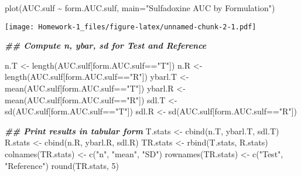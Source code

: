 \documentclass[
]{article}
\newenvironment{Shaded}{\begin{snugshade}}{\end{snugshade}}
\newcommand{\AttributeTok}[1]{\textcolor[rgb]{0.77,0.63,0.00}{#1}}
\newcommand{\DecValTok}[1]{\textcolor[rgb]{0.00,0.00,0.81}{#1}}
\newcommand{\DocumentationTok}[1]{\textcolor[rgb]{0.56,0.35,0.01}{\textbf{\textit{#1}}}}
\newcommand{\FunctionTok}[1]{\textcolor[rgb]{0.00,0.00,0.00}{#1}}
\newcommand{\NormalTok}[1]{#1}
\newcommand{\OtherTok}[1]{\textcolor[rgb]{0.56,0.35,0.01}{#1}}
\newcommand{\SpecialCharTok}[1]{\textcolor[rgb]{0.00,0.00,0.00}{#1}}
\newcommand{\StringTok}[1]{\textcolor[rgb]{0.31,0.60,0.02}{#1}}
\begin{document}
\begin{Shaded}
\begin{Highlighting}[]
\FunctionTok{plot}\NormalTok{(AUC.sulf }\SpecialCharTok{\textasciitilde{}}\NormalTok{ form.AUC.sulf, }\AttributeTok{main=}\StringTok{"Sulfadoxine AUC by Formulation"}\NormalTok{)}
\end{Highlighting}
\end{Shaded}

\texttt{[image: Homework-1\_files/figure-latex/unnamed-chunk-2-1.pdf]}

\begin{Shaded}
\begin{Highlighting}[]
\DocumentationTok{\#\# Compute n, ybar, sd for Test and Reference}

\NormalTok{n.T }\OtherTok{\textless{}{-}} \FunctionTok{length}\NormalTok{(AUC.sulf[form.AUC.sulf}\SpecialCharTok{==}\StringTok{"T"}\NormalTok{])}
\NormalTok{n.R }\OtherTok{\textless{}{-}} \FunctionTok{length}\NormalTok{(AUC.sulf[form.AUC.sulf}\SpecialCharTok{==}\StringTok{"R"}\NormalTok{])}
\NormalTok{ybarl.T }\OtherTok{\textless{}{-}} \FunctionTok{mean}\NormalTok{(AUC.sulf[form.AUC.sulf}\SpecialCharTok{==}\StringTok{"T"}\NormalTok{])}
\NormalTok{ybarl.R }\OtherTok{\textless{}{-}} \FunctionTok{mean}\NormalTok{(AUC.sulf[form.AUC.sulf}\SpecialCharTok{==}\StringTok{"R"}\NormalTok{])}
\NormalTok{sdl.T }\OtherTok{\textless{}{-}} \FunctionTok{sd}\NormalTok{(AUC.sulf[form.AUC.sulf}\SpecialCharTok{==}\StringTok{"T"}\NormalTok{])}
\NormalTok{sdl.R }\OtherTok{\textless{}{-}} \FunctionTok{sd}\NormalTok{(AUC.sulf[form.AUC.sulf}\SpecialCharTok{==}\StringTok{"R"}\NormalTok{])}

\DocumentationTok{\#\# Print results in tabular form}
\NormalTok{T.stats }\OtherTok{\textless{}{-}} \FunctionTok{cbind}\NormalTok{(n.T, ybarl.T, sdl.T)}
\NormalTok{R.stats }\OtherTok{\textless{}{-}} \FunctionTok{cbind}\NormalTok{(n.R, ybarl.R, sdl.R)}
\NormalTok{TR.stats }\OtherTok{\textless{}{-}} \FunctionTok{rbind}\NormalTok{(T.stats, R.stats)}
\FunctionTok{colnames}\NormalTok{(TR.stats) }\OtherTok{\textless{}{-}} \FunctionTok{c}\NormalTok{(}\StringTok{"n"}\NormalTok{, }\StringTok{"mean"}\NormalTok{, }\StringTok{"SD"}\NormalTok{)}
\FunctionTok{rownames}\NormalTok{(TR.stats) }\OtherTok{\textless{}{-}} \FunctionTok{c}\NormalTok{(}\StringTok{"Test"}\NormalTok{, }\StringTok{"Reference"}\NormalTok{)}
\FunctionTok{round}\NormalTok{(TR.stats, }\DecValTok{5}\NormalTok{)}
\end{Highlighting}
\end{Shaded}
\end{document}
